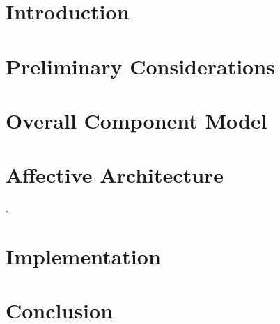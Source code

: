 \documentclass[draft,final]{vutinfth}
\begin{document}
	\chapter{Introduction}
	
	
	
	\chapter{Preliminary Considerations}\label{ch:preliminaryConsiderations}
	
	
	
	\chapter{Overall Component Model}\label{ch:componentModel}
	
	
	
	\chapter{Affective Architecture}\label{ch:affectiveArchitecture}.
	
	
	
	\chapter{Implementation}\label{ch:implementation}
	
	
	
	\chapter{Conclusion}\label{ch:conclusion}
	
	
	
	
	
	
	\backmatter
	
	
	
	
	\printindex
	
	
	
	
	
\end{document}
